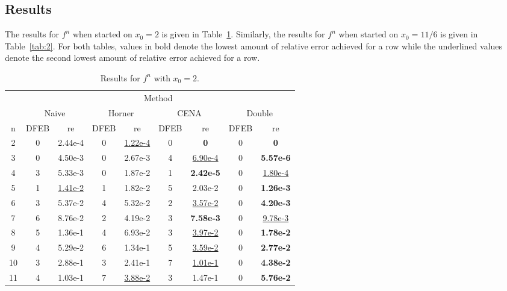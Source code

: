 \documentclass{standalone}
\begin{document}
	\subsection{Results}
	The results for $f^{n}$ when started on $x_{0}=2$ is given in Table~\ref{tab:1}. Similarly, the results for $f^{n}$ when started on $x_{0}=11/6$ is given in Table~\ref{tab:2}. For both tables, values in bold denote the lowest amount of relative error achieved for a row while the underlined values denote the second lowest amount of relative error achieved for a row.
	\clearpage
	\begin{table}
	\centering
	\begin{tabular*}{\textwidth}{ccccccccc}\toprule
	& \multicolumn{8}{c}{Method}\\
	\cmidrule{2-9}
	& \multicolumn{2}{P{3cm}}{Naive} & \multicolumn{2}{P{3cm}}{Horner} & \multicolumn{2}{P{3cm}}{CENA} & \multicolumn{2}{P{3cm}}{Double}\\
	\multicolumn{1}{P{0.73cm}}{n} & \multicolumn{1}{P{1.50cm}}{DFEB} & \multicolumn{1}{P{1.50cm}}{re} & \multicolumn{1}{P{1.50cm}}{DFEB} & \multicolumn{1}{P{1.50cm}}{re} & \multicolumn{1}{P{1.50cm}}{DFEB} & \multicolumn{1}{P{1.50cm}}{re} & \multicolumn{1}{P{1.50cm}}{DFEB} & \multicolumn{1}{P{1.50cm}}{re} \\
	\midrule
	 2 & 0 & 2.44e-4 & 0 & \underline{1.22e-4} & 0 & \textbf{0} & 0 & \textbf{0} \\
	 3 & 0 & 4.50e-3 & 0 & 2.67e-3 & 4 & \underline{6.90e-4} & 0 & \textbf{5.57e-6} \\
	 4 & 3 & 5.33e-3 & 0 & 1.87e-2 & 1 & \textbf{2.42e-5} & 0 & \underline{1.80e-4} \\
	 5 & 1 & \underline{1.41e-2} & 1 & 1.82e-2 & 5 & 2.03e-2 & 0 & \textbf{1.26e-3} \\
	 6 & 3 & 5.37e-2 & 4 & 5.32e-2 & 2 & \underline{3.57e-2} & 0 & \textbf{4.20e-3} \\
	 7 & 6 & 8.76e-2 & 2 & 4.19e-2 & 3 & \textbf{7.58e-3} & 0 & \underline{9.78e-3} \\
	 8 & 5 & 1.36e-1 & 4 & 6.93e-2 & 3 & \underline{3.97e-2} & 0 & \textbf{1.78e-2} \\
	 9 & 4 & 5.29e-2 & 6 & 1.34e-1 & 5 & \underline{3.59e-2} & 0 & \textbf{2.77e-2} \\
	10 & 3 & 2.88e-1 & 3 & 2.41e-1 & 7 & \underline{1.01e-1} & 0 & \textbf{4.38e-2} \\
	11 & 4 & 1.03e-1 & 7 & \underline{3.88e-2} & 3 & 1.47e-1 & 0 & \textbf{5.76e-2}
	\end{tabular*}
	\caption{Results for $f^{n}$ with $x_{0}=2$.}\label{tab:1}
	\end{table}
\end{document}
